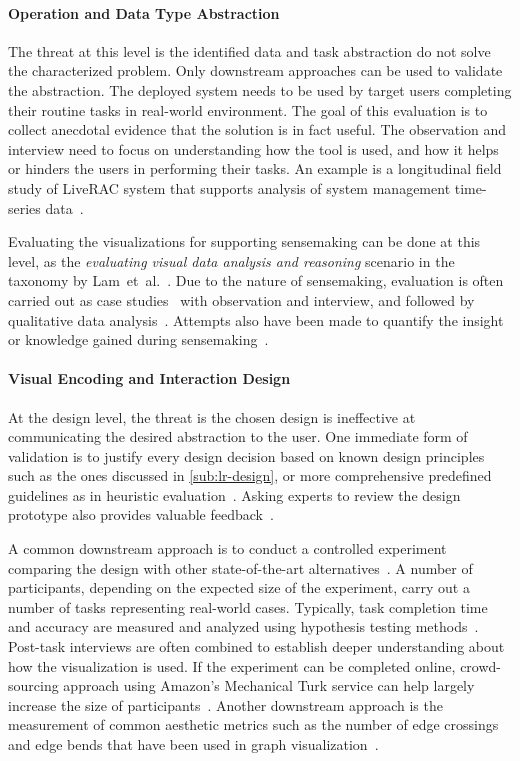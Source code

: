 \paragraph{Operation and Data Type Abstraction}
The threat at this level is the identified data and task abstraction do not solve the characterized problem. Only downstream approaches can be used to validate the abstraction. The deployed system needs to be used by target users completing their routine tasks in real-world environment. The goal of this evaluation is to collect anecdotal evidence that the solution is in fact useful. The observation and interview need to focus on understanding how the tool is used, and how it helps or hinders the users in performing their tasks. An example is a longitudinal field study of LiveRAC system that supports analysis of system management time-series data~\cite{McLachlan2008}.

Evaluating the visualizations for supporting sensemaking can be done at this level, as the \emph{evaluating visual data analysis and reasoning} scenario in the taxonomy by Lam~et~al.~\cite{Lam2012}. Due to the nature of sensemaking, evaluation is often carried out as case studies~\cite{Kang2011} with observation and interview, and followed by qualitative data analysis~\cite{Lazar2010}. Attempts also have been made to quantify the insight or knowledge gained during sensemaking~\cite{Wilson2013}.

\paragraph{Visual Encoding and Interaction Design}
At the design level, the threat is the chosen design is ineffective at communicating the desired abstraction to the user. One immediate form of validation is to justify every design decision based on known design principles such as the ones discussed in \autoref{sub:lr-design}, or more comprehensive predefined guidelines as in heuristic evaluation~\cite{Zuk2006}. Asking experts to review the design prototype also provides valuable feedback~\cite{Tory2005}.

A common downstream approach is to conduct a controlled experiment comparing the design with other state-of-the-art alternatives~\cite{Xu2012}. A number of participants, depending on the  expected size of the experiment, carry out a number of tasks representing real-world cases. Typically, task completion time and accuracy are measured and analyzed using hypothesis testing methods~\cite{Field2003}. Post-task interviews are often combined to establish deeper understanding about how the visualization is used. If the experiment can be completed online, crowd-sourcing approach using Amazon's Mechanical Turk service can help largely increase the size of participants~\cite{Heer2010a}. Another downstream approach is the measurement of common aesthetic metrics such as the number of edge crossings and edge bends that have been used in graph visualization~\cite{Sugiyama1981}.

